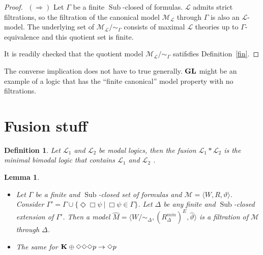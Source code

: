 \documentclass[a4paper]{article}
\theoremstyle{defin}
\newtheorem{defin}{Definition}
\theoremstyle{theorem}
\theoremstyle{prop}
\theoremstyle{lemma}
\newtheorem{lemma}{Lemma}
\theoremstyle{fact}
\theoremstyle{ex}
\theoremstyle{col}
\theoremstyle{claim}
\begin{document}
\begin{proof}
  $ $
$(\Rightarrow)$
  Let $\Gamma$ be a finite $\operatorname{Sub}$-closed of formulas. $\mathcal{L}$ admits strict filtrations, so the filtration of the canonical model $\mathcal{M}_{\mathcal{L}}$ through $\Gamma$ is also an $\mathcal{L}$-model. The underlying set of $\mathcal{M}_{\mathcal{L}} / \sim_{\Gamma}$ consists of maximal $\mathcal{L}$ theories up to $\Gamma$-equivalence and this quotient set is finite.

  It is readily checked that the quotient model $\mathcal{M}_{\mathcal{L}} / \sim_{\Gamma}$ satifsfies Definition~\ref{fin}.
\end{proof}

The converse implication does not have to true generally. ${\bf GL}$ might be an example of a logic that has the ``finite canonical'' model property with no filtrations.

\section{Fusion stuff}

\begin{defin}
  Let $\mathcal{L}_1$ and $\mathcal{L}_2$ be modal logics, then the fusion $\mathcal{L}_1 * \mathcal{L}_2$ is the minimal bimodal logic that contains $\mathcal{L}_1$ and $\mathcal{L}_2$ \cite{kurucz200715}.
\end{defin}

\begin{lemma}\label{extension}
  $ $

  \begin{itemize}
  \item Let $\Gamma$ be a finite and $\operatorname{Sub}$-closed set of formulas and $\mathcal{M} = \langle W, R, \vartheta \rangle$. Consider $\Gamma' = \Gamma \cup \{ \Diamond \Box \psi \: | \: \Box \psi \in \Gamma \}$. Let $\Delta$ be any finite and $\operatorname{Sub}$-closed extension of $\Gamma'$. Then a model $\widehat{M} = \langle W / \sim_{\Delta}, (R^{min}_{\Delta})^{E}, \widehat{\vartheta} \rangle$ is a filtration of $\mathcal{M}$ through $\Delta$.
  \item The same for ${\bf K} \oplus \Diamond \Diamond \Diamond p \to \Diamond p$
  \end{itemize}
\end{lemma}
\end{document}
